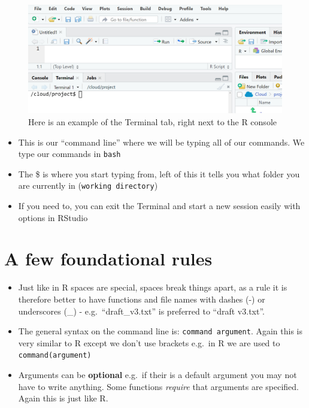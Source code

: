 \documentclass[
]{book}
\begin{document}
\begin{figure}

{\centering \includegraphics[width=0.8\linewidth]{images/terminal} 

}

\caption{Here is an example of the Terminal tab, right next to the R console}\label{fig:unnamed-chunk-4}
\end{figure}

\begin{itemize}
\item
  This is our ``command line'' where we will be typing all of our commands. We type our commands in \texttt{bash}
\item
  The \$ is where you start typing from, left of this it tells you what folder you are currently in (\texttt{working\ directory})
\item
  If you need to, you can exit the Terminal and start a new session easily with options in RStudio
\end{itemize}

\hypertarget{a-few-foundational-rules}{%
\section{A few foundational rules}\label{a-few-foundational-rules}}

\begin{itemize}
\item
  Just like in R spaces are special, spaces break things apart, as a rule it is therefore better to have functions and file names with dashes (-) or underscores (\_) - e.g.~``draft\_v3.txt'' is preferred to ``draft v3.txt''.
\item
  The general syntax on the command line is: \texttt{command\ argument}. Again this is very similar to R except we don't use brackets e.g.~in R we are used to \texttt{command(argument)}
\item
  Arguments can be \textbf{optional} e.g.~if their is a default argument you may not have to write anything. Some functions \emph{require} that arguments are specified. Again this is just like R.
\end{itemize}
\end{document}

